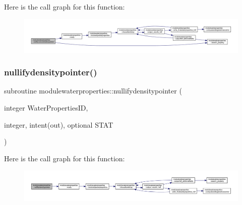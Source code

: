 Here is the call graph for this function\+:\nopagebreak
\begin{figure}[H]
\begin{center}
\leavevmode
\includegraphics[width=350pt]{namespacemodulewaterproperties_aded20695e00a7e2a2792781914847187_cgraph}
\end{center}
\end{figure}
\mbox{\label{namespacemodulewaterproperties_a36c17f1a6e6a657a207beb63be984d2a}} 
\subsubsection{\texorpdfstring{nullifydensitypointer()}{nullifydensitypointer()}}
{\footnotesize\ttfamily subroutine modulewaterproperties\+::nullifydensitypointer (\begin{DoxyParamCaption}\item[{integer}]{Water\+Properties\+ID,  }\item[{integer, intent(out), optional}]{S\+T\+AT }\end{DoxyParamCaption})\hspace{0.3cm}{\ttfamily [private]}}

Here is the call graph for this function\+:\nopagebreak
\begin{figure}[H]
\begin{center}
\leavevmode
\includegraphics[width=350pt]{namespacemodulewaterproperties_a36c17f1a6e6a657a207beb63be984d2a_cgraph}
\end{center}
\end{figure}
\mbox{\label{namespacemodulewaterproperties_a20976aef3db724e8f1b9ec39453b5a98}} 
